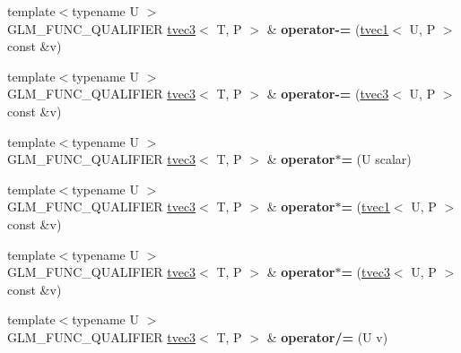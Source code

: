 \begin{DoxyCompactItemize}
{\footnotesize template$<$typename U $>$ }\\G\+L\+M\+\_\+\+F\+U\+N\+C\+\_\+\+Q\+U\+A\+L\+I\+F\+I\+ER \hyperlink{structglm_1_1tvec3}{tvec3}$<$ T, P $>$ \& {\bfseries operator-\/=} (\hyperlink{structglm_1_1tvec1}{tvec1}$<$ U, P $>$ const \&v)
\item 
\mbox{\label{structglm_1_1tvec3_acec58495abe12a054d93d709f629f3c1}} 
{\footnotesize template$<$typename U $>$ }\\G\+L\+M\+\_\+\+F\+U\+N\+C\+\_\+\+Q\+U\+A\+L\+I\+F\+I\+ER \hyperlink{structglm_1_1tvec3}{tvec3}$<$ T, P $>$ \& {\bfseries operator-\/=} (\hyperlink{structglm_1_1tvec3}{tvec3}$<$ U, P $>$ const \&v)
\item 
\mbox{\label{structglm_1_1tvec3_a2821dfbae32c67d80d2cda5e91f9b8f7}} 
{\footnotesize template$<$typename U $>$ }\\G\+L\+M\+\_\+\+F\+U\+N\+C\+\_\+\+Q\+U\+A\+L\+I\+F\+I\+ER \hyperlink{structglm_1_1tvec3}{tvec3}$<$ T, P $>$ \& {\bfseries operator$\ast$=} (U scalar)
\item 
\mbox{\label{structglm_1_1tvec3_ad9d8d504912c0ffba2632830103e2b0c}} 
{\footnotesize template$<$typename U $>$ }\\G\+L\+M\+\_\+\+F\+U\+N\+C\+\_\+\+Q\+U\+A\+L\+I\+F\+I\+ER \hyperlink{structglm_1_1tvec3}{tvec3}$<$ T, P $>$ \& {\bfseries operator$\ast$=} (\hyperlink{structglm_1_1tvec1}{tvec1}$<$ U, P $>$ const \&v)
\item 
\mbox{\label{structglm_1_1tvec3_ac4c17428380a59febbd0c5f369f90b21}} 
{\footnotesize template$<$typename U $>$ }\\G\+L\+M\+\_\+\+F\+U\+N\+C\+\_\+\+Q\+U\+A\+L\+I\+F\+I\+ER \hyperlink{structglm_1_1tvec3}{tvec3}$<$ T, P $>$ \& {\bfseries operator$\ast$=} (\hyperlink{structglm_1_1tvec3}{tvec3}$<$ U, P $>$ const \&v)
\item 
\mbox{\label{structglm_1_1tvec3_ada4a543b6b4fcdc9f364ca0a637f3f6d}} 
{\footnotesize template$<$typename U $>$ }\\G\+L\+M\+\_\+\+F\+U\+N\+C\+\_\+\+Q\+U\+A\+L\+I\+F\+I\+ER \hyperlink{structglm_1_1tvec3}{tvec3}$<$ T, P $>$ \& {\bfseries operator/=} (U v)
\item 
\mbox{\label{structglm_1_1tvec3_a8a8b6ba0700dfc397fe1bb232193de1d}} 

\end{DoxyCompactItemize}
